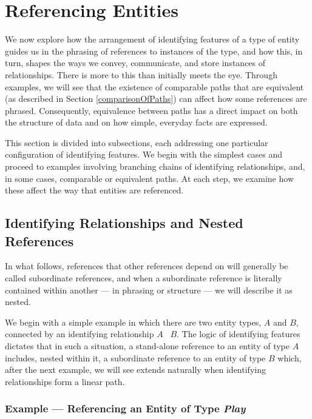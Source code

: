 
\newcommand{\BarkerEllisIdentiyingRelationship}{\barkerEllisJ}

\section{Referencing Entities}
\label{ReferencingEntities}

 We now explore how the arrangement of identifying features of a type of entity guides us in the phrasing of references to instances of the type, 
 and how this, in turn, shapes the ways we convey, communicate, and store instances of relationships.
There is more to this than initially meets the eye.
Through examples, we will see that the existence of comparable paths that are equivalent 
(as described in Section \ref{comparisonOfPaths}) can affect how  some references are phrased.
Consequently, equivalence between paths has a direct impact on both the structure of data and on how simple, everyday facts are expressed.

This section is divided into subsections, each addressing one particular configuration of identifying features.
We begin with the simplest cases and proceed to examples involving branching chains of identifying relationships, and, in some cases, comparable or equivalent paths.
At each step, we examine how these affect the way that entities are referenced.

\subsection{Identifying Relationships and Nested References}

In what follows, references that other references depend on will generally be called subordinate references, 
and when a subordinate reference is literally contained within another --- in phrasing or structure --- we will describe it as nested.

We begin with a simple example in which there are two entity types, $A$ and $B$, connected by an identifying relationship
$A$ \BarkerEllisIdentiyingRelationship\ $B$.
The logic of identifying features dictates that in such a situation, a stand-alone reference to an entity of type $A$ includes, nested within it, a subordinate reference to an entity of type $B$  which, after the next example, we will see extends naturally when identifying relationships form a linear path.

\subsubsection{Example — Referencing an Entity of Type \textit{Play}}

